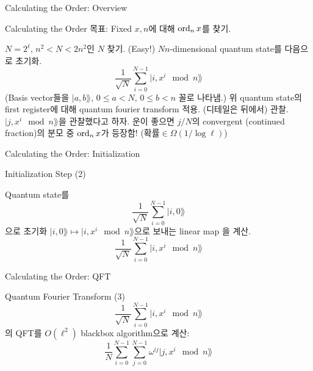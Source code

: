 \documentclass[../240513_msquare_shor.tex]{subfiles}
\begin{document}
\begin{frame}{Calculating the Order: Overview}
    \begin{block}{Calculating the Order}
        목표: Fixed \(x, n\)에 대해 \(\operatorname{ord}_n x\)를 찾기.
        \begin{enumerate}
            \ii
            \(N = 2^\ell\), \(n^2 < N < 2n^2\)인 \(N\) 찾기. (Easy!)
            \ii
            \(Nn\)-dimensional quantum state를 다음으로 초기화.
            \[
                \frac{1}{\sqrt{N}} \sum_{i=0}^{N-1} | i, x^i \mod n \rang
            \]
            (Basis vector들을 \(|a, b \rang\), \(0 \le a < N\), \(0 \le b < n\) 꼴로 나타냄.)
            \ii
            위 quantum state의 first register에 대해 quantum fourier transform 적용.
            (디테일은 뒤에서)
            \ii
            관찰. \(| j, x^i \mod n \rang\)을 관찰했다고 하자.
            \ii
            운이 좋으면 \(j/N\)의 convergent (continued fraction)의 분모 중
            \(\operatorname{ord}_n x\)가 등장함! (\(\text{확률} \in \Omega(1/\log \ell)\))
        \end{enumerate}
    \end{block}
\end{frame}

\begin{frame}{Calculating the Order: Initialization}
    \begin{exampleblock}{Initialization Step (2)}
        \begin{enumerate}
            \ii
            Quantum state를
            \[
                \frac{1}{\sqrt{N}}\sum_{i=0}^{N-1} | i, 0 \rang
            \]
            으로 초기화
            \pause
            \ii
            \(| i, 0 \rang \mapsto |i, x^i \mod n \rang\)으로 보내는 linear map
            을 계산.\footnotemark 
            \[
                \frac{1}{\sqrt{N}}\sum_{i=0}^{N-1} | i, x^i \mod n \rang
            \]
        \end{enumerate}
    \end{exampleblock}
\end{frame}

\begin{frame}{Calculating the Order: QFT}
    \begin{exampleblock}{Quantum Fourier Transform (3)}
        \[
            \frac{1}{\sqrt{N}}\sum_{i=0}^{N-1} | i, x^i \mod n \rang
        \]
        의 QFT를 \(O(\ell^2)\) blackbox algorithm으로 계산:
        \pause
        \[
            \frac{1}{N}\sum_{i=0}^{N-1}\sum_{j=0}^{N-1} \omega^{ij} | j, x^i \mod n \rang
        \]
    \end{exampleblock}
\end{frame}
\end{document}
